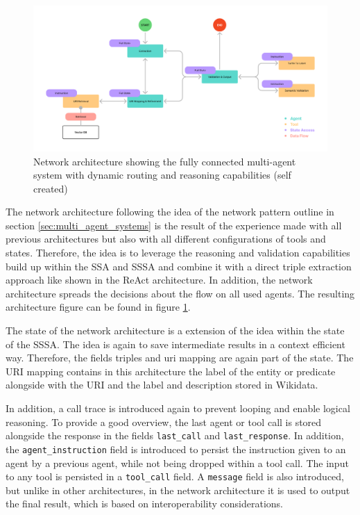 \documentclass[a4paper,oneside,bibliography=totoc]{scrbook}
\begin{document}
\begin{figure}[h]
  \centering
  \includegraphics[width=\textwidth]{figures/Network Architecture.png}
  \caption[Network architecture showing the fully connected multi-agent system with dynamic routing and reasoning capabilities]{Network architecture showing the fully connected multi-agent system with dynamic routing and reasoning capabilities (self created)}
  \label{fig:network_architecture}
\end{figure}

The network architecture following the idea of the network pattern outline in section \ref{sec:multi_agent_systems} is the result of the experience made with all previous architectures but also with all different configurations of tools and states. Therefore, the idea is to leverage the reasoning and validation capabilities build up within the \ac{SSA} and \ac{SSSA} and combine it with a direct triple extraction approach like shown in the ReAct architecture. In addition, the network architecture spreads the decisions about the flow on all used agents. The resulting architecture figure can be found in figure \ref{fig:network_architecture}.

The state of the network architecture is a extension of the idea within the state of the \ac{SSSA}. The idea is again to save intermediate results in a context efficient way. Therefore, the fields triples and uri mapping are again part of the state. The URI mapping contains in this architecture the label of the entity or predicate alongside with the URI and the label and description stored in Wikidata.

In addition, a call trace is introduced again to prevent looping and enable logical reasoning. To provide a good overview, the last agent or tool call is stored alongside the response in the fields \texttt{last\_call} and \texttt{last\_response}. In addition, the \texttt{agent\_instruction} field is introduced to persist the instruction given to an agent by a previous agent, while not being dropped within a tool call. The input to any tool is persisted in a \texttt{tool\_call} field. A \texttt{message} field is also introduced, but unlike in other architectures, in the network architecture it is used to output the final result, which is based on interoperability considerations.
\end{document}
